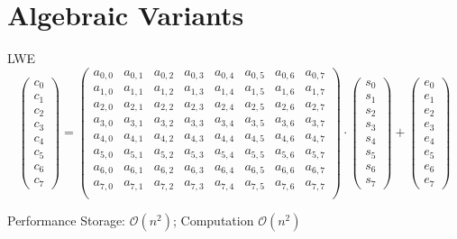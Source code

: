 \documentclass[xcolor=table,10pt,aspectratio=169]{beamer}
\begin{document}
\section{Algebraic Variants}
\label{sec:org54ab877}

\begin{frame}[label={sec:org7edfada}]{LWE}
\[
\begin{pmatrix}c_{0} \\ c_{1} \\ c_{2} \\ c_{3} \\ c_{4} \\ c_{5} \\ c_{6} \\ c_{7}\end{pmatrix} = 
\begin{pmatrix}
a_{0,0} & a_{0,1} & a_{0,2} & a_{0,3} & a_{0,4} & a_{0,5} & a_{0,6} & a_{0,7}\\
a_{1,0} & a_{1,1} & a_{1,2} & a_{1,3} & a_{1,4} & a_{1,5} & a_{1,6} & a_{1,7}\\
a_{2,0} & a_{2,1} & a_{2,2} & a_{2,3} & a_{2,4} & a_{2,5} & a_{2,6} & a_{2,7}\\
a_{3,0} & a_{3,1} & a_{3,2} & a_{3,3} & a_{3,4} & a_{3,5} & a_{3,6} & a_{3,7}\\
a_{4,0} & a_{4,1} & a_{4,2} & a_{4,3} & a_{4,4} & a_{4,5} & a_{4,6} & a_{4,7}\\
a_{5,0} & a_{5,1} & a_{5,2} & a_{5,3} & a_{5,4} & a_{5,5} & a_{5,6} & a_{5,7}\\
a_{6,0} & a_{6,1} & a_{6,2} & a_{6,3} & a_{6,4} & a_{6,5} & a_{6,6} & a_{6,7}\\
a_{7,0} & a_{7,1} & a_{7,2} & a_{7,3} & a_{7,4} & a_{7,5} & a_{7,6} & a_{7,7}\\
\end{pmatrix} \cdot
\begin{pmatrix}s_{0} \\ s_{1} \\ s_{2} \\ s_{3} \\ s_{4} \\ s_{5} \\ s_{6} \\ s_{7}\end{pmatrix} +
\begin{pmatrix}e_{0} \\ e_{1} \\ e_{2} \\ e_{3} \\ e_{4} \\ e_{5} \\ e_{6} \\ e_{7}\end{pmatrix}
\]
\begin{block}{Performance}
Storage: \(\mathcal{O}(n^{2})\); Computation \(\mathcal{O}(n^{2})\)
\end{block}
\end{frame}
\end{document}
